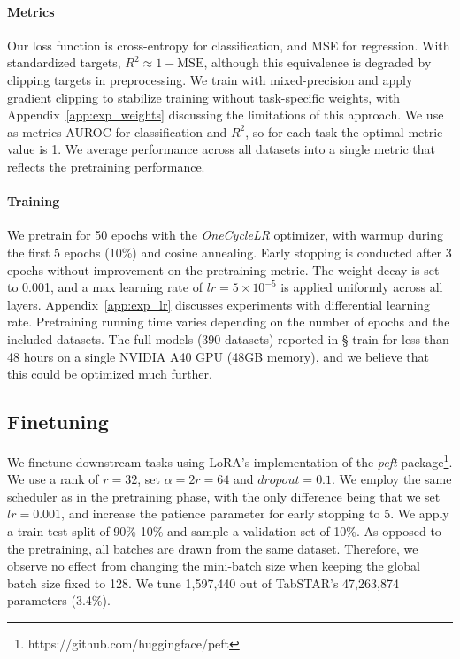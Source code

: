 \paragraph{Metrics} Our loss function is cross-entropy for classification, and MSE for regression. With standardized targets, \( R^2 \approx 1 - \text{MSE} \), although this equivalence is degraded by clipping targets in preprocessing. We train with mixed-precision and apply gradient clipping to stabilize training without task-specific weights, with Appendix~\ref{app:exp_weights} discussing the limitations of this approach. We use as metrics AUROC for classification and \(R^2\), so for each task the optimal metric value is 1. We average performance across all datasets into a single metric that reflects the pretraining performance.


\paragraph{Training} We pretrain for 50 epochs with the \textit{OneCycleLR} \cite{smith_super-convergence_2018} optimizer, with warmup during the first 5 epochs (10\%) and cosine annealing. Early stopping is conducted after 3 epochs without improvement on the pretraining metric. The weight decay is set to 0.001, and a max learning rate of $lr=5 \times 10^{-5}$ is applied uniformly across all layers. Appendix~\ref{app:exp_lr} discusses experiments with differential learning rate.
Pretraining running time varies depending on the number of epochs and the included datasets. The full models (390 datasets) reported in \S{} train for less than 48 hours on a single NVIDIA A40 GPU (48GB memory), and we believe that this could be optimized much further.


\subsection{Finetuning}
\label{app:lora}

We finetune downstream tasks using LoRA's implementation of the \textit{peft} package\footnote{https://github.com/huggingface/peft}. We use a rank of $r=32$, set $\alpha=2r=64$ and $dropout=0.1$. We employ the same scheduler as in the pretraining phase, with the only difference being that we set $lr=0.001$, and increase the patience parameter for early stopping to 5. We apply a train-test split of 90\%-10\% and sample a validation set of 10\%. As opposed to the pretraining, all batches are drawn from the same dataset. Therefore, we observe no effect from changing the mini-batch size when keeping the global batch size fixed to 128. We tune 1,597,440 out of TabSTAR's 47,263,874 parameters (3.4\%).

